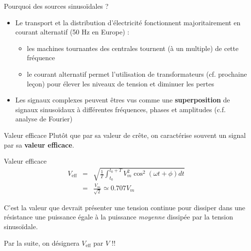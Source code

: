 \begin{frame}{Pourquoi des sources sinusoïdales ?}

  \begin{itemize}
    \item Le transport et la distribution d'électricité fonctionnent majoritairement en courant alternatif (50 Hz en Europe) : 
    \begin{itemize}
      \item les machines tournantes des centrales tournent (à un multiple) de cette fréquence
      \item le courant alternatif permet l'utilisation de transformateurs (cf. prochaine leçon) pour élever les niveaux de tension et diminuer les pertes
    \end{itemize} 
    \item Les signaux complexes peuvent êtres vus comme une \textbf{superposition} de signaux sinusoïdaux à différentes fréquences, phases et amplitudes (c.f. analyse de Fourier)
  \end{itemize}

\end{frame}

\begin{frame}{Valeur efficace}
Plutôt que par sa valeur de crête, on caractérise souvent un signal par sa \textbf{valeur efficace}.
\begin{block}{Valeur efficace}
\begin{eqnarray*}
	V_{\text {eff}}& =&\sqrt{\frac{1}{T}\int_{t_0}^{t_0+T}V_m^2\cos^2(\omega t + \phi)dt}\\
	& = & \frac{V_m}{\sqrt{2}} \simeq 0.707 V_m
\end{eqnarray*}
\end{block}
\vfill
C'est la valeur que devrait présenter une tension continue pour dissiper dans
une résistance une puissance égale à la puissance {\em moyenne}
dissipée par la tension sinusoïdale.
\vfill 

Par la suite, on désignera $V_{\text{eff}}$ par $V$ !!
\end{frame}


